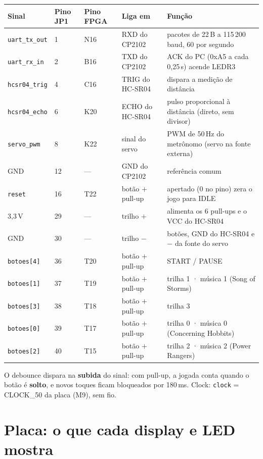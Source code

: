 \documentclass[9pt,a4paper]{extarticle}
\newcommand{\s}[1]{\texttt{#1}}          %
\begin{document}
\begin{tabularx}{\linewidth}{@{}l l l l Y@{}}
\toprule
Sinal & Pino JP1 & Pino FPGA & Liga em & Função \\
\midrule
\s{uart\_tx\_out} & 1  & N16 & RXD do CP2102          & pacotes de 22\,B a 115\,200 baud, 60 por segundo \\
\s{uart\_rx\_in}  & 2  & B16 & TXD do CP2102          & ACK do PC (0xA5 a cada 0,25\,s) acende LEDR3 \\
\s{hcsr04\_trig}  & 4  & C16 & TRIG do HC-SR04        & dispara a medição de distância \\
\s{hcsr04\_echo}  & 6  & K20 & ECHO do HC-SR04        & pulso proporcional à distância (direto, sem divisor) \\
\s{servo\_pwm}    & 8  & K22 & sinal do servo         & PWM de 50\,Hz do metrônomo (servo na fonte externa) \\
GND               & 12 & --- & GND do CP2102          & referência comum \\
\s{reset}         & 16 & T22 & botão $+$ pull-up      & apertado (0 no pino) zera o jogo para IDLE \\
3,3\,V            & 29 & --- & trilho $+$             & alimenta os 6 pull-ups e o VCC do HC-SR04 \\
GND               & 30 & --- & trilho $-$             & botões, GND do HC-SR04 e $-$ da fonte do servo \\
\s{botoes[4]}     & 36 & T20 & botão $+$ pull-up      & START / PAUSE \\
\s{botoes[1]}     & 37 & T19 & botão $+$ pull-up      & trilha 1 · música 1 (Song of Storms) \\
\s{botoes[3]}     & 38 & T18 & botão $+$ pull-up      & trilha 3 \\
\s{botoes[0]}     & 39 & T17 & botão $+$ pull-up      & trilha 0 · música 0 (Concerning Hobbits) \\
\s{botoes[2]}     & 40 & T15 & botão $+$ pull-up      & trilha 2 · música 2 (Power Rangers) \\
\bottomrule
\end{tabularx}

{\footnotesize O debounce dispara na \textbf{subida} do sinal: com pull-up, a jogada
conta quando o botão é \textbf{solto}, e novos toques ficam bloqueados por 180\,ms.
Clock: \s{clock} = CLOCK\_50 da placa (M9), sem fio.}

\clearpage
\section{Placa: o que cada display e LED mostra}
\end{document}
